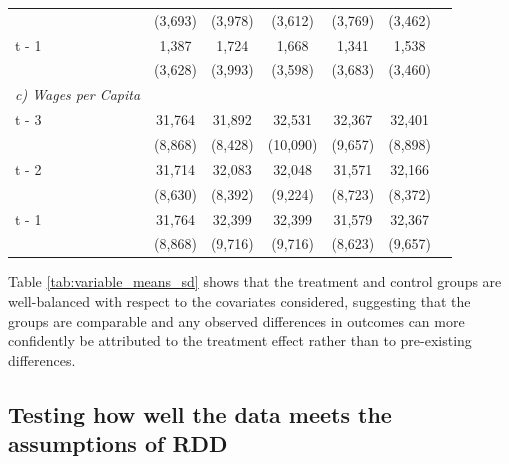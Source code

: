 \begin{longtable}{p{4cm}cccccc}
          & (3,693) & (3,978) & (3,612) & (3,769) & (3,462) \\
    t - 1 & 1,387 & 1,724 & 1,668 & 1,341 & 1,538 \\
          & (3,628) & (3,993) & (3,598) & (3,683) & (3,460) \\
    \textit{c) Wages per Capita} & & & & & \\
    t - 3 & 31,764 & 31,892 & 32,531 & 32,367 & 32,401 \\
          & (8,868) & (8,428) & (10,090) & (9,657) & (8,898) \\
    t - 2 & 31,714 & 32,083 & 32,048 & 31,571 & 32,166 \\
          & (8,630) & (8,392) & (9,224) & (8,723) & (8,372) \\
    t - 1 & 31,764 & 32,399 & 32,399 & 31,579 & 32,367 \\
          & (8,868) & (9,716) & (9,716) & (8,623) & (9,657) \\
\end{longtable}



Table \ref{tab:variable_means_sd} shows that the treatment and control groups are well-balanced with respect to the covariates considered, suggesting that the groups are comparable and any observed differences in outcomes can more confidently be attributed to the treatment effect rather than to pre-existing differences.

\subsection{Testing how well the data meets the assumptions of RDD}

